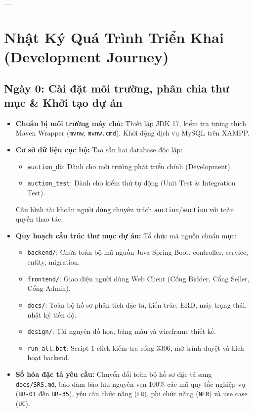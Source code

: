 \documentclass[a4paper]{article}
\begin{document}
---

\section{Nhật Ký Quá Trình Triển Khai (Development Journey)}

\subsection{Ngày 0: Cài đặt môi trường, phân chia thư mục \& Khởi tạo dự án}
\begin{itemize}
    \item \textbf{Chuẩn bị môi trường máy chủ:} Thiết lập JDK 17, kiểm tra tương thích Maven Wrapper (\texttt{mvnw}, \texttt{mvnw.cmd}). Khởi động dịch vụ MySQL trên XAMPP.
    \item \textbf{Cơ sở dữ liệu cục bộ:} Tạo sẵn hai database độc lập:
    \begin{itemize}
        \item \texttt{auction\_db}: Dành cho môi trường phát triển chính (Development).
        \item \texttt{auction\_test}: Dành cho kiểm thử tự động (Unit Test \& Integration Test).
    \end{itemize}
    Cấu hình tài khoản người dùng chuyên trách \texttt{auction}/\texttt{auction} với toàn quyền thao tác.
    \item \textbf{Quy hoạch cấu trúc thư mục dự án:} Tổ chức mã nguồn chuẩn mực:
    \begin{itemize}
        \item \texttt{backend/}: Chứa toàn bộ mã nguồn Java Spring Boot, controller, service, entity, migration.
        \item \texttt{frontend/}: Giao diện người dùng Web Client (Cổng Bidder, Cổng Seller, Cổng Admin).
        \item \texttt{docs/}: Toàn bộ hồ sơ phân tích đặc tả, kiến trúc, ERD, máy trạng thái, nhật ký tiến độ.
        \item \texttt{design/}: Tài nguyên đồ họa, bảng màu và wireframe thiết kế.
        \item \texttt{run\_all.bat}: Script 1-click kiểm tra cổng 3306, mở trình duyệt và kích hoạt backend.
    \end{itemize}
    \item \textbf{Số hóa đặc tả yêu cầu:} Chuyển đổi toàn bộ hồ sơ đặc tả sang \texttt{docs/SRS.md}, bảo đảm bảo lưu nguyên vẹn 100\% các mã quy tắc nghiệp vụ (\texttt{BR-01} đến \texttt{BR-35}), yêu cầu chức năng (\texttt{FR}), phi chức năng (\texttt{NFR}) và use case (\texttt{UC}).
\end{itemize}
\end{document}
